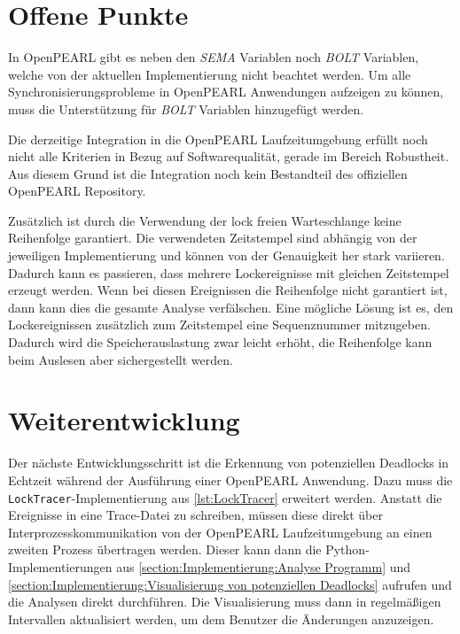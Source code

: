 \section{Offene Punkte}
\label{section:OffenePunkte}
In OpenPEARL gibt es neben den \emph{SEMA} Variablen noch \emph{BOLT} Variablen,
welche von der aktuellen Implementierung nicht beachtet werden. Um alle
Synchronisierungsprobleme in OpenPEARL Anwendungen aufzeigen zu können, muss die
Unterstützung für \emph{BOLT} Variablen hinzugefügt werden.

Die derzeitige Integration in die OpenPEARL Laufzeitumgebung erfüllt noch nicht
alle Kriterien in Bezug auf Softwarequalität, gerade im Bereich Robustheit. Aus
diesem Grund ist die Integration noch kein Bestandteil des offiziellen OpenPEARL
Repository.

Zusätzlich ist durch die Verwendung der lock freien Warteschlange keine
Reihenfolge garantiert. Die verwendeten Zeitstempel sind abhängig von der
jeweiligen Implementierung und können von der Genauigkeit her stark variieren.
Dadurch kann es passieren, dass mehrere Lockereignisse mit gleichen Zeitstempel
erzeugt werden. Wenn bei diesen Ereignissen die Reihenfolge nicht garantiert
ist, dann kann dies die gesamte Analyse verfälschen. Eine mögliche Lösung ist
es, den Lockereignissen zusätzlich zum Zeitstempel eine Sequenznummer
mitzugeben. Dadurch wird die Speicherauslastung zwar leicht erhöht, die
Reihenfolge kann beim Auslesen aber sichergestellt werden.

\section{Weiterentwicklung}
\label{section:Weiterentwicklung}
Der nächste Entwicklungsschritt ist die Erkennung von potenziellen Deadlocks in
Echtzeit während der Ausführung einer OpenPEARL Anwendung. Dazu muss die
\texttt{LockTracer}-Implementierung aus \cref{lst:LockTracer} erweitert werden.
Anstatt die Ereignisse in eine Trace-Datei zu schreiben, müssen diese direkt
über Interprozesskommunikation von der OpenPEARL Laufzeitumgebung an einen
zweiten Prozess übertragen werden. Dieser kann dann die Python-Implementierungen
aus \cref{section:Implementierung:Analyse Programm} und
\cref{section:Implementierung:Visualisierung von potenziellen Deadlocks}
aufrufen und die Analysen direkt durchführen. Die Visualisierung muss dann in
regelmäßigen Intervallen aktualisiert werden, um dem Benutzer die Änderungen
anzuzeigen.